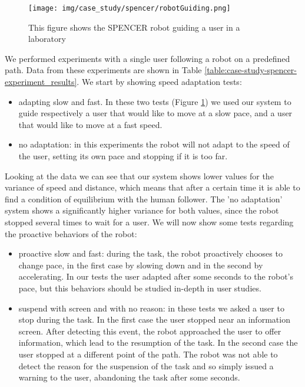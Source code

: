 \begin{figure}[ht!]
	\centering
	\texttt{[image: img/case\_study/spencer/robotGuiding.png]}
	\caption{This figure shows the SPENCER robot guiding a user in a laboratory}
	\label{fig:case_study-spencer-robotGuiding}
\end{figure}

We performed experiments with a single user following a robot on a predefined path. Data from these experiments are shown in Table \ref{table:case-study-spencer-experiment_results}. We start by showing speed adaptation tests:
\begin{itemize}
\item adapting slow and fast. In these two tests (Figure \ref{fig:case_study-spencer-robotGuiding}) we used our system to guide respectively a user that would like to move at a slow pace, and a user that would like to move at a fast speed.
\item no adaptation: in this experiments the robot will not adapt to the speed of the user, setting its own pace and stopping if it is too far.
\end{itemize}

Looking at the data we can see that our system shows lower values for the variance of speed and distance, which means that after a certain time it is able to find a condition of equilibrium with the human follower. The 'no adaptation' system shows a significantly higher variance for both values, since the robot stopped several times to wait for a user. We will now show some tests regarding the proactive behaviors of the robot:

\begin{itemize}
\item proactive slow and fast: during the task, the robot proactively chooses to change pace, in the first case by slowing down and in the second by accelerating. In our tests the user adapted after some seconds to the robot's pace, but this behaviors should be studied in-depth in user studies.
\item suspend with screen and with no reason: in these tests we asked a user to stop during the task. In the first case the user stopped near an information screen. After detecting this event, the robot approached the user to offer information, which lead to the resumption of the task. In the second case the user stopped at a different point of the path. The robot was not able to detect the reason for the suspension of the task and so simply   issued a warning to the user, abandoning the task after some seconds.
\end{itemize}


